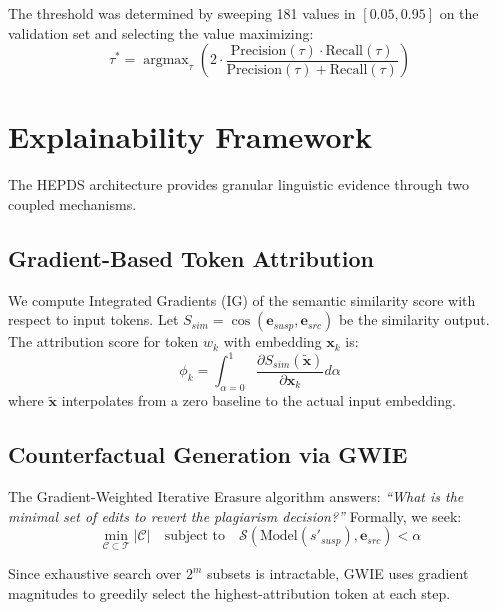 \documentclass[pdflatex,sn-basic]{sn-jnl}
\begin{document}
The threshold was determined by sweeping 181 values in $[0.05, 0.95]$ on the validation set and selecting the value maximizing:
\begin{equation}
\tau^* = \operatorname{argmax}_{\tau} \left( 2 \cdot \frac{\text{Precision}(\tau) \cdot \text{Recall}(\tau)}{\text{Precision}(\tau) + \text{Recall}(\tau)} \right)
\end{equation}

\section{Explainability Framework}

The HEPDS architecture provides granular linguistic evidence through two coupled mechanisms.

\subsection{Gradient-Based Token Attribution}

We compute Integrated Gradients (IG) of the semantic similarity score with respect to input tokens. Let $S_{sim} = \cos(\mathbf{e}_{susp}, \mathbf{e}_{src})$ be the similarity output. The attribution score for token $w_k$ with embedding $\mathbf{x}_k$ is:
\begin{equation}
\phi_k = \int_{\alpha=0}^{1} \frac{\partial S_{sim}(\tilde{\mathbf{x}})}{\partial \mathbf{x}_k} d\alpha
\end{equation}
where $\tilde{\mathbf{x}}$ interpolates from a zero baseline to the actual input embedding.

\subsection{Counterfactual Generation via GWIE}

The Gradient-Weighted Iterative Erasure algorithm answers: \textit{``What is the minimal set of edits to revert the plagiarism decision?''} Formally, we seek:
\begin{equation}
\min_{\mathcal{C} \subset \mathcal{T}} |\mathcal{C}| \quad \text{subject to} \quad \mathcal{S}(\text{Model}(s'_{susp}), \mathbf{e}_{src}) < \alpha
\end{equation}

Since exhaustive search over $2^m$ subsets is intractable, GWIE uses gradient magnitudes to greedily select the highest-attribution token at each step.
\end{document}
